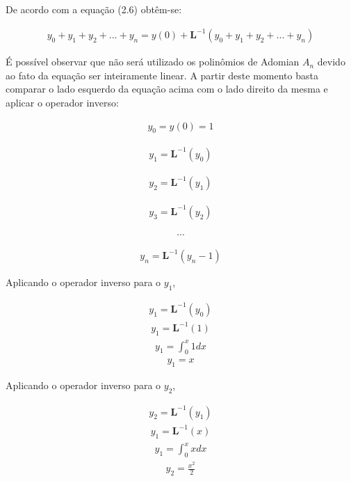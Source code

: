  De acordo com a equação (2.6) obtêm-se:
 
  \begin{gather*}
  y_{0} +y_{1} + y_{2} + ... + y_{n}  = y(0) + \textbf{L}^{-1}( y_{0} +y_{1} + y_{2} + ... + y_{n})
\end{gather*}

É possível observar que não será utilizado os polinômios de Adomian $A_{n}$  devido ao fato da equação ser inteiramente linear.
A partir deste momento basta comparar o lado esquerdo da equação acima com o lado direito da mesma e aplicar o operador inverso:

\begin{gather*}
  y_{0} = y(0) = 1
\end{gather*}

\begin{gather*}
  y_{1} = \textbf{L}^{-1} (y_{0})
\end{gather*}

\begin{gather*}
  y_{2} = \textbf{L}^{-1} (y_{1})
\end{gather*}

\begin{gather*}
  y_{3} = \textbf{L}^{-1} (y_{2})
\end{gather*}

\begin{gather*}
  ...
\end{gather*}

 \begin{gather*}
  y_{n} = \textbf{L}^{-1} (y_{n} - 1)
\end{gather*}

Aplicando o operador inverso para o $y_{1}$, 

\begin{gather*}
  y_{1} = \textbf{L}^{-1} (y_{0})
\end{gather*}
\begin{gather*}
  y_{1} = \textbf{L}^{-1}(1)
\end{gather*}
\begin{gather*}
  y_{1} =\int_0^{x} 1dx
\end{gather*}
\begin{gather*}
  y_{1} = x
\end{gather*}

Aplicando o operador inverso para o $y_{2}$,

\begin{gather*}
  y_{2} = \textbf{L}^{-1} (y_{1})
\end{gather*}
\begin{gather*}
  y_{1} = \textbf{L}^{-1}(x)
\end{gather*}
\begin{gather*}
  y_{1} =\int_0^{x} xdx
\end{gather*}
\begin{gather*}
  y_{2} = \frac{x^{2}}{2}
\end{gather*}

